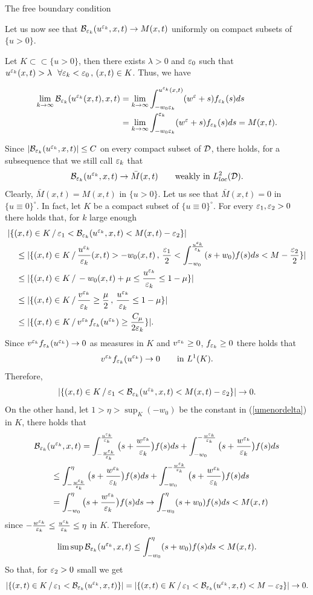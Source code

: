 \begin{section}{The free boundary condition}
\begin{pf}
\medskip

Let us now see that ${\cal B}_{\varepsilon_k}(u^{\varepsilon_k},x,t)\to M(x,t)$
uniformly on compact subsets of $\{ u>0 \}$.

Let $K\subset\subset \{ u>0 \}$, then there exists $\lambda>0$ and $\varepsilon_0$
such that $u^{\varepsilon_k}(x,t)>\lambda\ \ \forall \varepsilon_k<\varepsilon_0\,,\,(x,t)\in K$.
Thus, we have

\begin{align*}
\lim_{k\to\infty}{\cal B}_{\varepsilon_k}(u^{\varepsilon_k}(x,t),x,t)&=
\lim_{k\to\infty}\int_{-w_0{\varepsilon_k}}^{u^{\varepsilon_k}(x,t)}(w^{\varepsilon}+s)f_{\varepsilon_k}(s)ds\\
&=\lim_{k\to\infty}\int_{-w_0{\varepsilon_k}}^{\varepsilon_k}(w^{\varepsilon}+s)f_{\varepsilon_k}(s)ds=M(x,t).
\end{align*}

 
Since $|{\cal B}_{{\varepsilon_k}}(u^{\varepsilon_k},x,t)|\le C$ on every compact subset of ${\cal D}$,
there holds, for a subsequence that we still call ${\varepsilon_k}$ that
$$
{\cal B}_{{\varepsilon_k}}(u^{\varepsilon_k},x,t)\to \bar M(x,t)\qquad\mbox{weakly in }L^2_{loc}({\cal D}).
$$
Clearly, $\bar M(x,t)=M(x,t)$ in $\{u>0\}$. Let us see that $\bar M(x,t)=0$
in $\{u\equiv0\}^\circ$. In fact, let $K$ be a compact subset of $\{u\equiv0\}
^\circ$.
For every $\varepsilon_1,\varepsilon_2>0$ there holds that, for $k$ large enough
\begin{align*}
&|\{(x,t)\in K\,/\,\varepsilon_1<{\cal B}_{{\varepsilon_k}}(u^{\varepsilon_k},x,t)<M(x,t)-\varepsilon_2\}|\\
&\quad\le |\{(x,t)\in K\,/\,\frac{u^{\varepsilon_k}}{{\varepsilon_k}}(x,t)>-w_0(x,t)\,,\,\frac
{\varepsilon_1}2<\int_{-w_0}^{\frac{u^{\varepsilon_k}}{{\varepsilon_k}}}(s+w_0)f(s)ds<M-\frac{\varepsilon_2}2\}|\\
&\quad\le |\{(x,t)\in K\,/\, -w_0(x,t)+\mu\le\frac{u^{\varepsilon_k}}{{\varepsilon_k}}\le 1-\mu\}|\\
&\quad\le |\{(x,t)\in K\,/\,\frac{v^{\varepsilon_k}}{{\varepsilon_k}}\ge\frac\mu2\,,\,\frac{u^{\varepsilon_k}}
{{\varepsilon_k}}\le 1-\mu\}|\\
&\quad\le|\{(x,t)\in K\,/\, v^{\varepsilon_k} f_{{\varepsilon_k}}(u^{\varepsilon_k})\ge \frac{C_\mu}{2{\varepsilon_k}}\}|.
\end{align*}
Since $v^{\varepsilon_k} f_{{\varepsilon_k}}(u^{\varepsilon_k})\to 0$ as measures in $K$ and $v^{\varepsilon_k}\ge0$,
$f_{{\varepsilon_k}}\ge0$ there holds that
$$
v^{\varepsilon_k} f_{{\varepsilon_k}}(u^{\varepsilon_k})\to 0 \qquad\mbox{in }L^1(K).
$$
Therefore,
$$
|\{ (x,t)\in K\,/\,\varepsilon_1<{\cal B}_{{\varepsilon_k}}(u^{\varepsilon_k},x,t)<M(x,t)-\varepsilon_2\}|\to 0.
$$
On the other hand,
let $1>\eta>\sup_K(-w_0)$ be the constant in (\ref{umenordelta})  in $K$, there holds that
\begin{align*}
&{\cal B}_{{\varepsilon_k}}(u^{\varepsilon_k},x,t)= \int_{-\frac{w^{\varepsilon_k}}{{\varepsilon_k}}}^{\frac{u^{\varepsilon_k}}{{\varepsilon_k}}}\big(
s+\frac{w^{\varepsilon_k}}{{\varepsilon_k}}\big)f(s)ds+
\int_{-w_0}^{-\frac{w^{\varepsilon_k}}{{\varepsilon_k}}}\big(s+\frac{w^{\varepsilon_k}}{{\varepsilon_k}}\big)f(s)ds\\
&\qquad\le  \int_{-\frac{w^{\varepsilon_k}}{{\varepsilon_k}}}^{\eta}\big(s+\frac{w^{\varepsilon_k}}{{\varepsilon_k}}\big)
f(s)ds+
\int_{-w_0}^{-\frac{w^{\varepsilon_k}}{{\varepsilon_k}}}\big(s+\frac{w^{\varepsilon_k}}{{\varepsilon_k}}\big)f(s)ds\\
&\qquad=\int_{-w_0}^\eta\big(s+\frac{w^{\varepsilon_k}}{{\varepsilon_k}}\big)f(s)ds\to
\int_{-w_0}^\eta(s+w_0)f(s)ds<M(x,t)
\end{align*}
since $-\frac{w^{\varepsilon_k}}{{\varepsilon_k}}\le \frac{u^{\varepsilon_k}}{{\varepsilon_k}}\le \eta$ in $K$.
Therefore,
$$
\limsup{\cal B}_{{\varepsilon_k}}(u^{\varepsilon_k},x,t)\le\int_{-w_0}^{\eta}(s+w_0)f(s)ds<M(x,t).
$$
 So that, for $\varepsilon_2>0$ small we get
$$
|\{(x,t)\in K\,/\,\varepsilon_1<{\cal B}_{{\varepsilon_k}}(u^{\varepsilon_k},x,t)\}|=|\{(x,t)\in K\,/\,
\varepsilon_1<{\cal B}_{{\varepsilon_k}}(u^{\varepsilon_k},x,t)<M-\varepsilon_2\}|\to 0.
$$


\end{pf}
\end{section}
